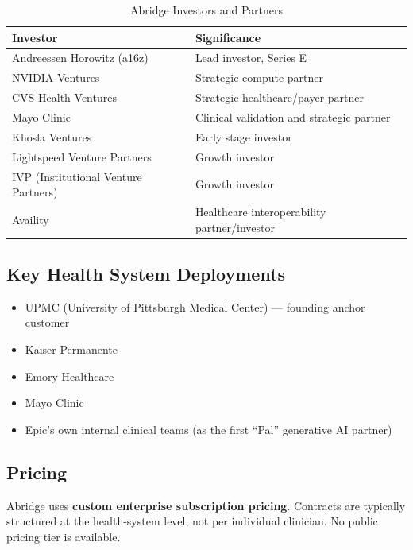 \documentclass[12pt,a4paper]{article}
\begin{document}
\begin{table}[H]
\centering
\renewcommand{\arraystretch}{1.4}
\begin{tabularx}{\textwidth}{lX}
\toprule
\textbf{Investor} & \textbf{Significance} \\
\midrule
Andreessen Horowitz (a16z) & Lead investor, Series E \\
NVIDIA Ventures & Strategic compute partner \\
CVS Health Ventures & Strategic healthcare/payer partner \\
Mayo Clinic & Clinical validation and strategic partner \\
Khosla Ventures & Early stage investor \\
Lightspeed Venture Partners & Growth investor \\
IVP (Institutional Venture Partners) & Growth investor \\
Availity & Healthcare interoperability partner/investor \\
\bottomrule
\end{tabularx}
\caption{Abridge Investors and Partners}
\end{table}

\subsection{Key Health System Deployments}

\begin{itemize}[noitemsep]
    \item UPMC (University of Pittsburgh Medical Center) --- founding anchor customer
    \item Kaiser Permanente
    \item Emory Healthcare
    \item Mayo Clinic
    \item Epic's own internal clinical teams (as the first ``Pal'' generative AI partner)
\end{itemize}

\subsection{Pricing}

Abridge uses \textbf{custom enterprise subscription pricing}. Contracts are typically structured at the health-system level, not per individual clinician. No public pricing tier is available.

\newpage

\end{document}
